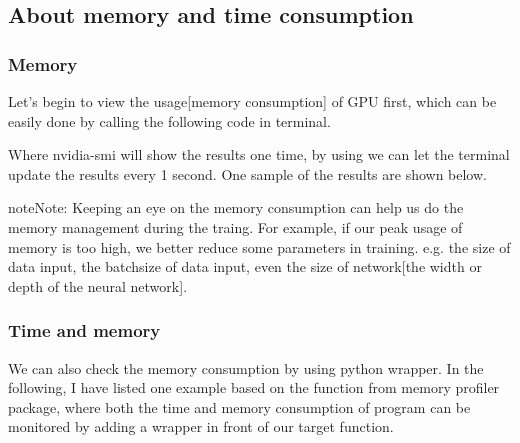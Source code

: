 \documentclass[letterpaper,10pt,english]{sphinxmanual}
\let\sphinxpxdimen\pdfpxdimen\else\newdimen\sphinxpxdimen
\begin{document}
\subsection{About memory and time consumption}
\label{\detokenize{usage/adjust:about-memory-and-time-consumption}}

\subsubsection{Memory}
\label{\detokenize{usage/adjust:memory}}
Let’s begin to view the usage{[}memory consumption{]} of GPU first, which can be easily done by calling the following code in terminal.

%
\begin{sphinxVerbatim}[commandchars=\\\{\}]
\end{sphinxVerbatim}

Where nvidia-smi will show the results one time, by using  we can let the terminal update the results every 1 second. One sample of the results are shown below.

\noindent{\hspace*{\fill}\sphinxincludegraphics[width=500\sphinxpxdimen]{{memory}.png}\hspace*{\fill}}

\begin{sphinxadmonition}{note}{Note:}
Keeping an eye on the memory consumption can help us do the memory management during the traing. For example, if our peak usage of memory is too high, we better reduce some parameters in training. e.g. the size of data input, the batchsize of data input, even the size of network{[}the width or depth of the neural network{]}.
\end{sphinxadmonition}


\subsubsection{Time and memory}
\label{\detokenize{usage/adjust:time-and-memory}}
We can also check the memory consumption by using python wrapper. In the following, I have listed one example based on the  function from memory profiler package, where both the time and memory consumption of program can be monitored by adding a wrapper in front of our target function.
\end{document}
